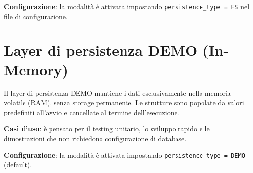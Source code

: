 \textbf{Configurazione}: la modalità è attivata impostando
\texttt{persistence\_type = FS} nel file di configurazione.

\section{Layer di persistenza DEMO (In-Memory)}
Il layer di persistenza DEMO mantiene i dati esclusivamente nella memoria
volatile (RAM), senza storage permanente. Le strutture sono popolate da valori
predefiniti all'avvio e cancellate al termine dell'esecuzione.

\textbf{Casi d'uso}: è pensato per il testing unitario, lo sviluppo rapido e
le dimostrazioni che non richiedono configurazione di database.

\textbf{Configurazione}: la modalità è attivata impostando
\texttt{persistence\_type = DEMO} (default).
